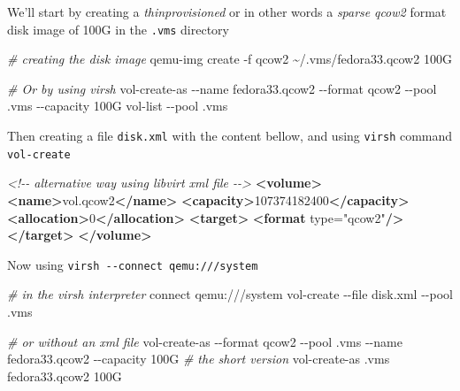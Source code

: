\documentclass[
  14pt,
  english,
  a4paper,
]{scrreprt}
\newenvironment{Shaded}{}{}
\newcommand{\CommentTok}[1]{\textcolor[rgb]{0.38,0.63,0.69}{\textit{#1}}}
\newcommand{\ExtensionTok}[1]{#1}
\newcommand{\KeywordTok}[1]{\textcolor[rgb]{0.00,0.44,0.13}{\textbf{#1}}}
\newcommand{\NormalTok}[1]{#1}
\newcommand{\OtherTok}[1]{\textcolor[rgb]{0.00,0.44,0.13}{#1}}
\newcommand{\StringTok}[1]{\textcolor[rgb]{0.25,0.44,0.63}{#1}}
\begin{document}
We'll start by creating a \emph{thinprovisioned} or in other words a
\emph{sparse} \emph{qcow2} format disk image of 100G in the
\texttt{.vms} directory

\begin{Shaded}
\begin{Highlighting}[]
\CommentTok{\# creating the disk image}
\ExtensionTok{qemu{-}img}\NormalTok{ create {-}f qcow2 \textasciitilde{}/.vms/fedora33.qcow2 100G}
\end{Highlighting}
\end{Shaded}

\begin{Shaded}
\begin{Highlighting}[]
\CommentTok{\# Or by using virsh}
\ExtensionTok{vol{-}create{-}as}\NormalTok{ {-}{-}name fedora33.qcow2 {-}{-}format qcow2 {-}{-}pool .vms {-}{-}capacity 100G}
\ExtensionTok{vol{-}list}\NormalTok{ {-}{-}pool .vms}
\end{Highlighting}
\end{Shaded}

Then creating a file \texttt{disk.xml} with the content bellow, and
using \texttt{virsh} command \texttt{vol-create}

\begin{Shaded}
\begin{Highlighting}[]
\CommentTok{\textless{}!{-}{-} alternative way using libvirt xml file {-}{-}\textgreater{}}
\KeywordTok{\textless{}volume\textgreater{}}
  \KeywordTok{\textless{}name\textgreater{}}\NormalTok{vol.qcow2}\KeywordTok{\textless{}/name\textgreater{}}
  \KeywordTok{\textless{}capacity\textgreater{}}\NormalTok{107374182400}\KeywordTok{\textless{}/capacity\textgreater{}}
  \KeywordTok{\textless{}allocation\textgreater{}}\NormalTok{0}\KeywordTok{\textless{}/allocation\textgreater{}}
  \KeywordTok{\textless{}target\textgreater{}}
    \KeywordTok{\textless{}format}\OtherTok{ type=}\StringTok{"qcow2"}\KeywordTok{/\textgreater{}}
  \KeywordTok{\textless{}/target\textgreater{}}
\KeywordTok{\textless{}/volume\textgreater{}}
\end{Highlighting}
\end{Shaded}

Now using \texttt{virsh\ -\/-connect\ qemu:///system}

\begin{Shaded}
\begin{Highlighting}[]
\CommentTok{\# in the virsh interpreter}
\ExtensionTok{connect}\NormalTok{ qemu:///system}
\ExtensionTok{vol{-}create}\NormalTok{ {-}{-}file disk.xml {-}{-}pool .vms}

\CommentTok{\# or without an xml file}
\ExtensionTok{vol{-}create{-}as}\NormalTok{ {-}{-}format qcow2 {-}{-}pool .vms {-}{-}name fedora33.qcow2 {-}{-}capacity 100G}
\CommentTok{\# the short version}
\ExtensionTok{vol{-}create{-}as}\NormalTok{ .vms fedora33.qcow2 100G}
\end{Highlighting}
\end{Shaded}
\end{document}
